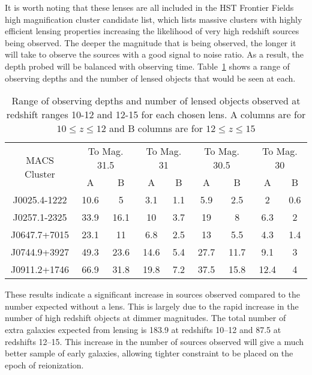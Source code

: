 		It is worth noting that these lenses are all included in the HST Frontier Fields high magnification cluster candidate list, which lists massive clusters with highly efficient lensing properties increasing the likelihood of very high redshift sources being observed\cite{HST_strong_magnification}. The deeper the magnitude that is being observed, the longer it will take to observe the sources with a good signal to noise ratio. As a result, the depth probed will be balanced with observing time. Table~\ref{tab:observing_depths_and_number_of_lensed_objects} shows a range of observing depths and the number of lensed objects that would be seen at each.
		\begin{table}[!htbp]
			\begin{center}
				\begin{tabular}{c||c|c|c|c|c|c|c|c}
		\multirow{2}{*}{MACS Cluster} & \multicolumn{2}{c|}{To Mag. 31.5}	&\multicolumn{2}{c|}{To Mag. 31} &\multicolumn{2}{c|}{To Mag. 30.5}	&\multicolumn{2}{c}{To Mag. 30}\\
					\cline{2-9}
						&A	&B	&A	&B	&A	&B	&A	&B\\
					\hline\hline
					J0025.4-1222	&10.6	&5	&3.1	&1.1	&5.9	&2.5	&2	&0.6\\
					J0257.1-2325	&33.9	&16.1	&10	&3.7	&19	&8	&6.3	&2\\
					J0647.7+7015	&23.1	&11	&6.8	&2.5	&13	&5.5	&4.3	&1.4\\
					J0744.9+3927	&49.3	&23.6	&14.6	&5.4	&27.7	&11.7	&9.1	&3\\
					J0911.2+1746	&66.9	&31.8	&19.8	&7.2	&37.5	&15.8	&12.4	&4
				\end{tabular}
			\end{center}
			\caption{Range of observing depths and number of lensed objects observed at redshift ranges 10-12 and 12-15 for each chosen lens. A columns are for $10\le z\le 12$ and B columns are for $12\le z\le 15$\label{tab:observing_depths_and_number_of_lensed_objects}}
		\end{table}

		These results indicate a significant increase in sources observed compared to the number expected without a lens. This is largely due to the rapid increase in the number of high redshift objects at dimmer magnitudes. The total number of extra galaxies expected from lensing is 183.9 at redshifts 10--12 and 87.5 at redshifts 12--15. This increase in the number of sources observed will give a much better sample of early galaxies, allowing tighter constraint to be placed on the epoch of reionization.

